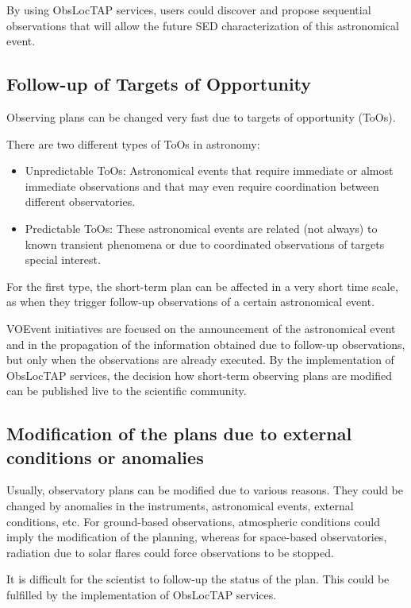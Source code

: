 \documentclass[11pt,a4paper]{ivoa}
\begin{document}
By using ObsLocTAP services, users could discover and propose sequential observations 
that will allow the future SED characterization of this astronomical event.

\subsection{Follow-up of Targets of Opportunity}
Observing plans can be changed very fast due to targets of opportunity (ToOs).

There are two different types of ToOs in astronomy:
\begin{itemize}
	\item Unpredictable ToOs: Astronomical events that require immediate or almost immediate observations and that may even require coordination between different observatories.

	\item Predictable ToOs: These astronomical events are related (not always) to known transient phenomena or due to coordinated observations of targets special interest. 
\end{itemize}

For the first type, the short-term plan can be affected in a very short time scale, as 
when they trigger follow-up observations of a certain astronomical event.

VOEvent initiatives are focused on the announcement of the astronomical event and in 
the propagation of the information obtained due to follow-up observations, but only 
when the observations are already executed. By the implementation of ObsLocTAP services, 
the decision how short-term observing plans are modified can be published live to the 
scientific community.

\subsection{Modification of the plans due to external conditions or anomalies}
Usually, observatory plans can be modified due to various reasons. They could be 
changed by anomalies in the instruments, astronomical events, external conditions, etc. 
For ground-based observations, atmospheric conditions could imply the modification 
of the planning, whereas for space-based observatories, radiation due to solar flares 
could force observations to be stopped.

It is difficult for the scientist to follow-up the status of the plan. This could be 
fulfilled by the implementation of ObsLocTAP services.
\end{document}
